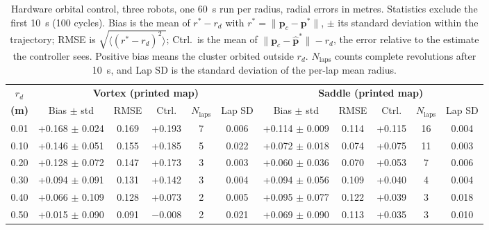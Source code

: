 \begin{table}[!t]
\centering
\footnotesize
\caption{Hardware orbital control, three robots, one 60~s run per radius, radial errors in metres. Statistics exclude the first 10~s (100 cycles). Bias is the mean of $r^* - r_d$ with $r^* = \|\mathbf{p}_c - \mathbf{p}^*\|$, $\pm$ its standard deviation within the trajectory; RMSE is $\sqrt{\langle (r^* - r_d)^2 \rangle}$; Ctrl.\ is the mean of $\|\mathbf{p}_c - \hat{\mathbf{p}}^*\| - r_d$, the error relative to the estimate the controller sees. Positive bias means the cluster orbited outside $r_d$. $N_{\mathrm{laps}}$ counts complete revolutions after 10~s, and Lap SD is the standard deviation of the per-lap mean radius.}
\label{tab:orbital_radius_comparison}
\setlength{\tabcolsep}{3pt}
\begin{tabular}{c|ccccc|ccccc}
\hline
\textbf{$r_d$} & \multicolumn{5}{c|}{\textbf{Vortex (printed map)}} & \multicolumn{5}{c}{\textbf{Saddle (printed map)}} \\
\textbf{(m)} & Bias $\pm$ std & RMSE & Ctrl. & $N_{\mathrm{laps}}$ & Lap SD & Bias $\pm$ std & RMSE & Ctrl. & $N_{\mathrm{laps}}$ & Lap SD \\
\hline
0.01 & +0.168 $\pm$ 0.024 & 0.169 & +0.193 & 7 & 0.006 & +0.114 $\pm$ 0.009 & 0.114 & +0.115 & 16 & 0.004 \\
0.10 & +0.146 $\pm$ 0.051 & 0.155 & +0.185 & 5 & 0.022 & +0.072 $\pm$ 0.018 & 0.074 & +0.075 & 11 & 0.003 \\
0.20 & +0.128 $\pm$ 0.072 & 0.147 & +0.173 & 3 & 0.003 & +0.060 $\pm$ 0.036 & 0.070 & +0.053 & 7 & 0.006 \\
0.30 & +0.094 $\pm$ 0.091 & 0.131 & +0.142 & 3 & 0.004 & +0.094 $\pm$ 0.056 & 0.109 & +0.040 & 4 & 0.004 \\
0.40 & +0.066 $\pm$ 0.109 & 0.128 & +0.073 & 2 & 0.005 & +0.095 $\pm$ 0.077 & 0.122 & +0.039 & 3 & 0.018 \\
0.50 & +0.015 $\pm$ 0.090 & 0.091 & $-$0.008 & 2 & 0.021 & +0.069 $\pm$ 0.090 & 0.113 & +0.035 & 3 & 0.010 \\
\hline
\end{tabular}
\end{table}
